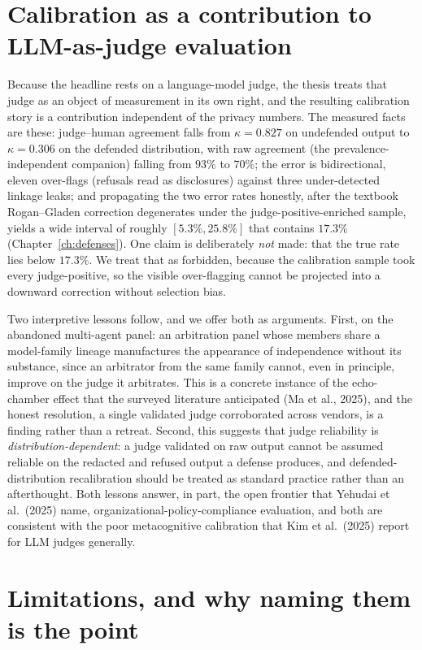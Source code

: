 \documentclass[11pt,a4paper]{report}
\begin{document}
\section{Calibration as a contribution to LLM-as-judge evaluation}
\label{sec:disc-judge}

Because the headline rests on a language-model judge, the thesis treats that judge as an object
of measurement in its own right, and the resulting calibration story is a contribution
independent of the privacy numbers. The measured facts are these: judge--human agreement falls
from $\kappa = 0.827$ on undefended output to $\kappa = 0.306$ on the defended distribution,
with raw agreement (the prevalence-independent companion) falling from $93\%$ to $70\%$; the
error is bidirectional, eleven over-flags (refusals read as disclosures) against three
under-detected linkage leaks; and propagating the two error rates honestly, after the textbook
Rogan--Gladen correction degenerates under the judge-positive-enriched sample, yields a wide
interval of roughly $[5.3\%, 25.8\%]$ that contains $17.3\%$ (Chapter~\ref{ch:defenses}). One
claim is deliberately \emph{not} made: that the true rate lies below $17.3\%$. We treat that as
forbidden, because the calibration sample took every judge-positive, so the visible over-flagging
cannot be projected into a downward correction without selection bias.

Two interpretive lessons follow, and we offer both as arguments. First, on the abandoned
multi-agent panel: an arbitration panel whose members share a model-family lineage
manufactures the appearance of independence without its substance, since an arbitrator from the
same family cannot, even in principle, improve on the judge it arbitrates. This is a concrete
instance of the echo-chamber effect that the surveyed literature anticipated
(Ma et al., 2025), and the honest resolution, a single validated judge corroborated across
vendors, is a finding rather than a retreat. Second, this suggests that judge
reliability is \emph{distribution-dependent}: a judge validated on raw output cannot be assumed
reliable on the redacted and refused output a defense produces, and
defended-distribution recalibration should be treated as standard practice rather than an
afterthought. Both lessons answer, in part, the open frontier that Yehudai et al.\ (2025)
name, organizational-policy-compliance evaluation, and both are consistent with the poor
metacognitive calibration that Kim et al.\ (2025) report for LLM judges generally.

\section{Limitations, and why naming them is the point}
\label{sec:disc-limits}
\end{document}
